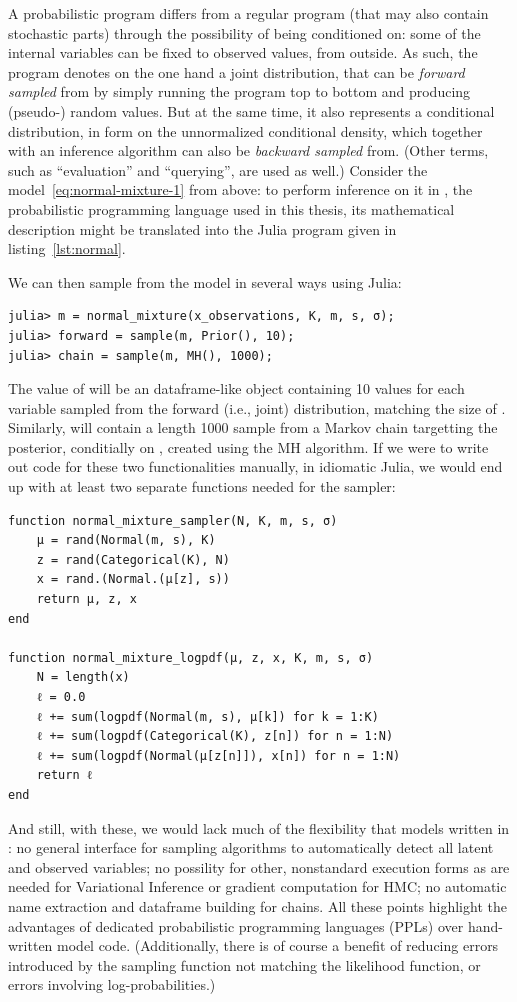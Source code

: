 A probabilistic program differs from a regular program (that may also contain stochastic parts)
through the possibility of being conditioned on: some of the internal variables can be fixed to
observed values, from outside. As such, the program denotes on the one hand a joint distribution,
that can be \emph{forward sampled} from by simply running the program top to bottom and producing
(pseudo-) random values.  But at the same time, it also represents a conditional distribution, in
form on the unnormalized conditional density, which together with an inference algorithm can also be
\emph{backward sampled} from.  (Other terms, such as \enquote{evaluation} and \enquote{querying},
are used as well.)  Consider the model~\eqref{eq:normal-mixture-1} from above: to perform inference
on it in \turingjl{} \parencite{ge2018turing}, the probabilistic programming language used in this
thesis, its mathematical description might be translated into the Julia program given in
listing~\ref{lst:normal}.

We can then sample from the model in several ways using Julia:
\begin{lstlisting}
julia> m = normal_mixture(x_observations, K, m, s, σ);
julia> forward = sample(m, Prior(), 10);
julia> chain = sample(m, MH(), 1000);
\end{lstlisting}
The value of  will be an dataframe-like object containing 10 values for each variable
sampled from the forward (i.e., joint) distribution, matching the size of .
Similarly,  will contain a length 1000 sample from a Markov chain targetting the
posterior, conditially on , created using the MH algorithm.  If we were to
write out code for these two functionalities manually, in idiomatic Julia, we would end up with at
least two separate functions needed for the sampler:
\begin{lstlisting}
function normal_mixture_sampler(N, K, m, s, σ)
    μ = rand(Normal(m, s), K)
    z = rand(Categorical(K), N)
    x = rand.(Normal.(μ[z], s))
    return μ, z, x
end

function normal_mixture_logpdf(μ, z, x, K, m, s, σ)
    N = length(x)
    ℓ = 0.0
    ℓ += sum(logpdf(Normal(m, s), μ[k]) for k = 1:K)
    ℓ += sum(logpdf(Categorical(K), z[n]) for n = 1:N)
    ℓ += sum(logpdf(Normal(μ[z[n]]), x[n]) for n = 1:N)
    return ℓ
end
\end{lstlisting}
And still, with these, we would lack much of the flexibility that models written in \turingjl: no
general interface for sampling algorithms to automatically detect all latent and observed variables;
no possility for other, nonstandard execution forms as are needed for Variational Inference or
gradient computation for HMC; no automatic name extraction and dataframe building for chains.  All
these points highlight the advantages of dedicated probabilistic programming languages (PPLs) over
hand-written model code.  (Additionally, there is of course a benefit of reducing errors introduced
by the sampling function not matching the likelihood function, or errors involving
log-probabilities.)

